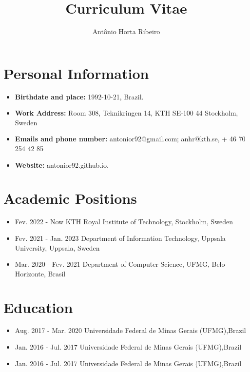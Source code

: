 \documentclass[10pt,A4]{article} %
\title{Curriculum Vitae}
\author{Ant\^onio Horta Ribeiro}
\begin{document}
\maketitle
\small 
\section {Personal Information} 

\begin{itemize}
\item {\bf Birthdate and place:} 1992-10-21, Brazil.
    \item {\bf Work Address:} Room  308, Teknikringen 14, KTH SE-100 44 Stockholm, Sweden
    \item {\bf Emails and phone number:} antonior92@gmail.com; anhr@kth.se,  + 46 70 254 42 85 \item
      {\bf Website:} antonior92.github.io.
\end{itemize}

\section{Academic Positions} %

\begin{itemize}

    \item {}
    { Fev. 2022 -   Now  }
    { KTH Royal Institute of Technology, Stockholm, Sweden  }{}

    \item {}
    { Fev. 2021 -   Jan. 2023  }
    { Department of Information Technology, Uppsala University, Uppsala, Sweden  }{}

    \item {}
    { Mar. 2020 -   Fev. 2021  }
    { Department of Computer Science, UFMG, Belo Horizonte, Brasil  }{}

\end{itemize}
  
\section{Education} %

\begin{itemize}

    \item {}
    { Aug. 2017 - Mar. 2020 }
    { Universidade Federal de Minas Gerais (UFMG),Brazil }{}

    \item {}
    { Jan. 2016 - Jul. 2017 }
    { Universidade Federal de Minas Gerais (UFMG),Brazil }{}

    \item {}
    { Jan. 2016 - Jul. 2017 }
    { Universidade Federal de Minas Gerais (UFMG),Brazil }{}

\end{itemize}
  
\end{document}
